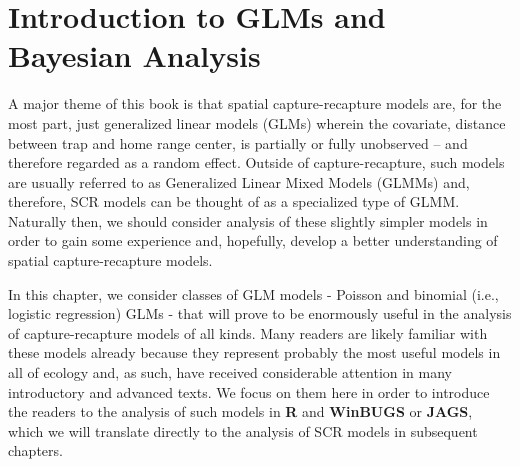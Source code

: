 \chapter{
Introduction to GLMs and Bayesian Analysis
}
\label{chapt.glms}

\vspace{.3in}




A major theme of this book is that spatial capture-recapture models
are, for the most part, just generalized linear models (GLMs) wherein
the covariate, distance between trap and home range center, is
partially or fully unobserved  -- and therefore regarded as
a random effect. Outside of capture-recapture, such models
are usually referred to as Generalized Linear Mixed Models (GLMMs)
and, therefore, SCR models can be thought of as a specialized type of
GLMM. Naturally then, we should consider analysis of these slightly
simpler models in order to gain some experience and, hopefully,
develop a better understanding of spatial capture-recapture models.

In this chapter, we consider classes of GLM models - Poisson and
binomial (i.e., logistic regression) GLMs - that will prove to be
enormously useful in the analysis of capture-recapture models of all
kinds. Many readers are likely familiar with these models already because
they represent probably
the most useful models in all of ecology and, as
such, have received considerable attention in many introductory and
advanced texts. We focus on them here in order to introduce the
readers to the analysis of such models in {\bf R} and {\bf WinBUGS} or
{\bf JAGS},
which we will
translate directly to the analysis of SCR models in subsequent
chapters.

